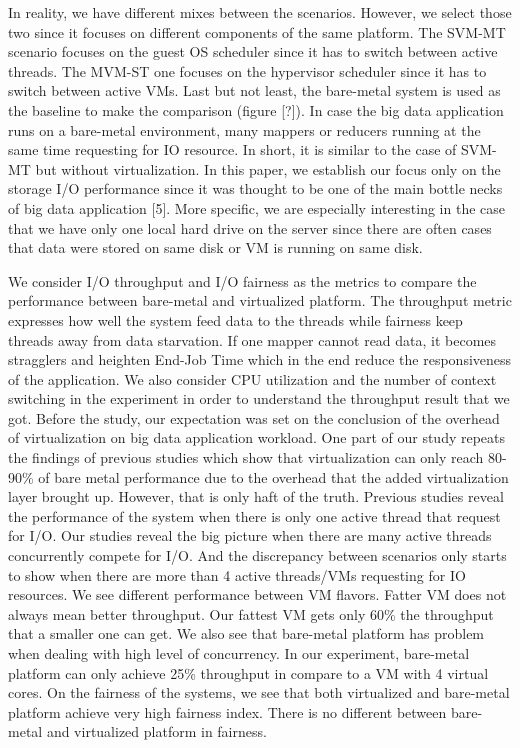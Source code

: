 \documentclass{acmsig}
\begin{document}
In reality, we have different mixes between the scenarios. However, we select those two since it focuses on different components of the same platform. The SVM-MT scenario focuses on the guest OS scheduler since it has to switch between active threads. The MVM-ST one focuses on the hypervisor scheduler since it has to switch between active VMs. Last but not least, the bare-metal system is used as the baseline to make the comparison (figure [?]). In case the big data application runs on a bare-metal environment, many mappers or reducers running at the same time requesting for IO resource. In short, it is similar to the case of SVM-MT but without virtualization. In this paper, we establish our focus only on the storage I/O performance since it was thought to be one of the main bottle necks of big data application [5]. More specific, we are especially interesting in the case that we have only one local hard drive on the server since there are often cases that data were stored on same disk or VM is running on same disk.

We consider I/O throughput and I/O fairness as the metrics to compare the performance between bare-metal and virtualized platform. The throughput metric expresses how well the system feed data to the threads while fairness keep threads away from data starvation. If one mapper cannot read data, it becomes stragglers and heighten End-Job Time which in the end reduce the responsiveness of the application. We also consider CPU utilization and the number of context switching in the experiment in order to understand the throughput result that we got. Before the study, our expectation was set on the conclusion of the overhead of virtualization on big data application workload. One part of our study repeats the findings of previous studies which show that virtualization can only reach 80-90\% of bare metal performance due to the overhead that the added virtualization layer brought up. However, that is only haft of the truth. Previous studies reveal the performance of the system when there is only one active thread that request for I/O. Our studies reveal the big picture when there are many active threads concurrently compete for I/O. And the discrepancy between scenarios only starts to show when there are more than 4 active threads/VMs requesting for IO resources. We see different performance between VM flavors. Fatter VM does not always mean better throughput. Our fattest VM gets only 60\% the throughput that a smaller one can get. We also see that bare-metal platform has problem when dealing with high level of concurrency. In our experiment, bare-metal platform can only achieve 25\% throughput in compare to a VM with 4 virtual cores. On the fairness of the systems, we see that both virtualized and bare-metal platform achieve very high fairness index. There is no different between bare-metal and virtualized platform in fairness.
\end{document}
